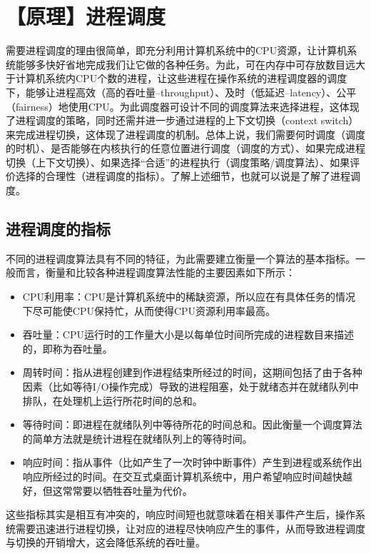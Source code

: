 \section{【原理】进程调度}\label{ux539fux7406ux8fdbux7a0bux8c03ux5ea6}

需要进程调度的理由很简单，即充分利用计算机系统中的CPU资源，让计算机系统能够多快好省地完成我们让它做的各种任务。为此，可在内存中可存放数目远大于计算机系统内CPU个数的进程，让这些进程在操作系统的进程调度器的调度下，能够让进程高效（高的吞吐量--throughput）、及时（低延迟--latency）、公平（fairness）地使用CPU。为此调度器可设计不同的调度算法来选择进程，这体现了进程调度的策略，同时还需并进一步通过进程的上下文切换（context
switch）来完成进程切换，这体现了进程调度的机制。总体上说，我们需要何时调度（调度的时机）、是否能够在内核执行的任意位置进行调度（调度的方式）、如果完成进程切换（上下文切换）、如果选择``合适''的进程执行（调度策略/调度算法）、如果评价选择的合理性（进程调度的指标）。了解上述细节，也就可以说是了解了进程调度。

\subsection{进程调度的指标}\label{ux8fdbux7a0bux8c03ux5ea6ux7684ux6307ux6807}

不同的进程调度算法具有不同的特征，为此需要建立衡量一个算法的基本指标。一般而言，衡量和比较各种进程调度算法性能的主要因素如下所示：

\begin{itemize}
\tightlist
\item
  CPU利用率：CPU是计算机系统中的稀缺资源，所以应在有具体任务的情况下尽可能使CPU保持忙，从而使得CPU资源利用率最高。
\item
  吞吐量：CPU运行时的工作量大小是以每单位时间所完成的进程数目来描述的，即称为吞吐量。
\item
  周转时间：指从进程创建到作进程结束所经过的时间，这期间包括了由于各种因素（比如等待I/O操作完成）导致的进程阻塞，处于就绪态并在就绪队列中排队，在处理机上运行所花时间的总和。
\item
  等待时间：即进程在就绪队列中等待所花的时间总和。因此衡量一个调度算法的简单方法就是统计进程在就绪队列上的等待时间。
\item
  响应时间：指从事件（比如产生了一次时钟中断事件）产生到进程或系统作出响应所经过的时间。在交互式桌面计算机系统中，用户希望响应时间越快越好，但这常常要以牺牲吞吐量为代价。
\end{itemize}

这些指标其实是相互有冲突的，响应时间短也就意味着在相关事件产生后，操作系统需要迅速进行进程切换，让对应的进程尽快响应产生的事件，从而导致进程调度与切换的开销增大，这会降低系统的吞吐量。

